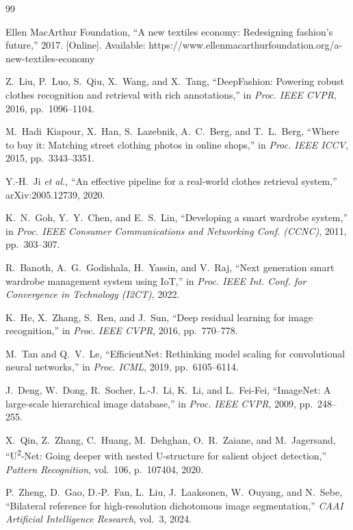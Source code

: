 \documentclass[conference]{IEEEtran}
\begin{document}
\begin{thebibliography}{99}

Ellen MacArthur Foundation, ``A new textiles economy: Redesigning fashion's future,'' 2017. [Online]. Available: https://www.ellenmacarthurfoundation.org/a-new-textiles-economy

Z.~Liu, P.~Luo, S.~Qiu, X.~Wang, and X.~Tang, ``DeepFashion: Powering robust clothes recognition and retrieval with rich annotations,'' in \emph{Proc. IEEE CVPR}, 2016, pp.~1096--1104.

M.~Hadi~Kiapour, X.~Han, S.~Lazebnik, A.~C.~Berg, and T.~L.~Berg, ``Where to buy it: Matching street clothing photos in online shops,'' in \emph{Proc. IEEE ICCV}, 2015, pp.~3343--3351.

Y.-H.~Ji \emph{et al.}, ``An effective pipeline for a real-world clothes retrieval system,'' arXiv:2005.12739, 2020.

K.~N.~Goh, Y.~Y.~Chen, and E.~S.~Lin, ``Developing a smart wardrobe system,'' in \emph{Proc. IEEE Consumer Communications and Networking Conf. (CCNC)}, 2011, pp.~303--307.

R.~Banoth, A.~G.~Godishala, H.~Yassin, and V.~Raj, ``Next generation smart wardrobe management system using IoT,'' in \emph{Proc. IEEE Int. Conf. for Convergence in Technology (I2CT)}, 2022.

K.~He, X.~Zhang, S.~Ren, and J.~Sun, ``Deep residual learning for image recognition,'' in \emph{Proc. IEEE CVPR}, 2016, pp.~770--778.

M.~Tan and Q.~V.~Le, ``EfficientNet: Rethinking model scaling for convolutional neural networks,'' in \emph{Proc. ICML}, 2019, pp.~6105--6114.

J.~Deng, W.~Dong, R.~Socher, L.-J.~Li, K.~Li, and L.~Fei-Fei, ``ImageNet: A large-scale hierarchical image database,'' in \emph{Proc. IEEE CVPR}, 2009, pp.~248--255.

X.~Qin, Z.~Zhang, C.~Huang, M.~Dehghan, O.~R.~Zaiane, and M.~Jagersand, ``U\textsuperscript{2}-Net: Going deeper with nested U-structure for salient object detection,'' \emph{Pattern Recognition}, vol.~106, p.~107404, 2020.

P.~Zheng, D.~Gao, D.-P.~Fan, L.~Liu, J.~Laaksonen, W.~Ouyang, and N.~Sebe, ``Bilateral reference for high-resolution dichotomous image segmentation,'' \emph{CAAI Artificial Intelligence Research}, vol.~3, 2024.


\end{thebibliography}
\end{document}
